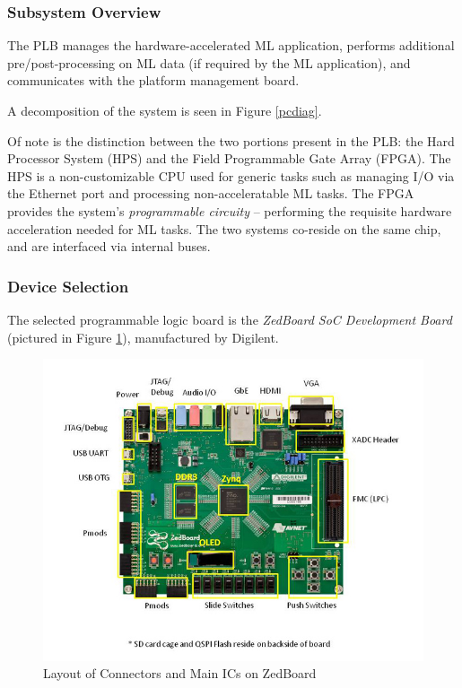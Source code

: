 \subsubsection{Subsystem Overview}
The PLB manages the hardware-accelerated ML application, performs additional pre/post-processing on ML data (if required by the ML application), and communicates with the platform management board.

A decomposition of the system is seen in Figure \ref{pcdiag}.

Of note is the distinction between the two portions present in the PLB: the Hard Processor System (HPS) and the Field Programmable Gate Array (FPGA). The HPS is a non-customizable CPU used for generic tasks such as managing I/O via the Ethernet port and processing non-acceleratable ML tasks. The FPGA provides the system's \textit{programmable circuity} -- performing the requisite hardware acceleration needed for ML tasks. The two systems co-reside on the same chip, and are interfaced via internal buses.

\subsubsection{Device Selection}
The selected programmable logic board is the \textit{ZedBoard SoC Development Board} (pictured in Figure \ref{zedboard}), manufactured by Digilent. 

\begin{figure}
\centering
\includegraphics[width=12.5cm]{img/zedboard_functional_overview.jpg}
\caption[Layout of Connectors and Main ICs on ZedBoard]{Layout of Connectors and Main ICs on ZedBoard \cite{zedboard}}
\label{zedboard}
\end{figure}

